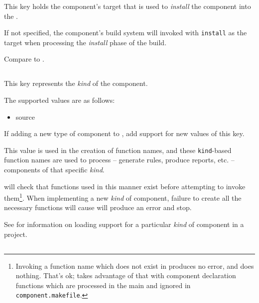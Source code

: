 This key holds the component's \makefile target that is used to
\emph{install} the component into the \destdir.

If not specified, the component's build system will invoked with
\texttt{install} as the target when processing the \emph{install}
phase of the build.

Compare to .


\subsection{}\label{variables:kind}

This key represents the \emph{kind} of the component.

The supported values are as follows:

\begin{itemize}
\item source
\end{itemize}

If adding a new type of component to \lmsbw, add support for new
values of this key.

This value is used in the creation of function names, and these
\texttt{kind}-based function names are used to process -- generate
rules, produce reports, etc. -- components of that specific
\emph{kind}.

\lmsbw will check that functions used in this manner exist before
attempting to invoke them\footnote{Invoking a function name which does
  not exist in \gnumake produces no error, and does nothing.  That's
  ok; \lmsbw takes advantage of that with component declaration
  functions which are processed in the main \makefile and ignored in
  \texttt{component.makefile}.}.  When implementing a new \emph{kind}
of component, failure to create all the necessary functions will cause
\lmsbw will produce an error and stop.

See  for information on
loading support for a particular \emph{kind} of component in a
project.


\subsection{}\label{variables:no-parallel}

